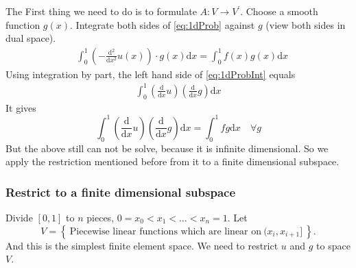 The First thing we need to do is to formulate $A: V\to V^\prime$. 
Choose a smooth function $g(x)$.
Integrate both sides of \eqref{eq:1dProb} against $g$ (view both sides in dual space).
\begin{equation}\label{eq:1dProbInt}
\begin{split}
   &\int_0^1 \left( -\frac{\textrm{d}^2}{\textrm{d} x^2} u(x) \right) \cdot g(x) \textrm{d}x = \int_0^1 f(x)  g(x) \textrm{d}x 
 \end{split}
\end{equation}
Using integration by part, the left hand side of \eqref{eq:1dProbInt} equals
\begin{equation}
\begin{split}
 \int_0^1 \left( \frac{\textrm{d}}{\textrm{d} x} u \right) \left( \frac{\textrm{d}}{\textrm{d} x} g \right) \textrm{d}x 
\end{split}
\end{equation}
It gives 
\begin{equation}
 \int_0^1 \left( \frac{\textrm{d}}{\textrm{d} x} u \right) \left( \frac{\textrm{d}}{\textrm{d} x} g \right) \textrm{d}x = \int_0^1 f g \textrm{d}x  \quad \forall g
\end{equation}
But the above still can not be solve, because it is infinite dimensional. 
So we apply the restriction mentioned before from it to a finite dimensional subspace. 

\subsubsection{Restrict to a finite dimensional subspace}

Divide $[0,1]$ to $n$ pieces, $0=x_0<x_1<\ldots<x_n=1$.
Let $$V = \left\{\ \textrm{Piecewise linear functions which are linear on}\ (x_i,x_{i+1}]\ \right\}.$$ And this is the simplest finite element space.
We need to restrict $u$ and $g$ to space $V$.


